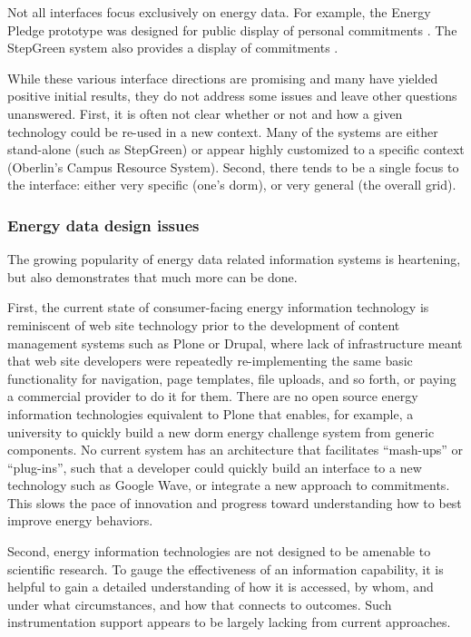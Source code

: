 Not all interfaces focus exclusively on energy data.  For example, the
Energy Pledge prototype was designed for public display of personal
commitments \cite{Pierce09}.  The StepGreen system also provides a display
of commitments \cite{StepGreen}.  

While these various interface directions are promising and many have
yielded positive initial results, they do not address some issues and leave
other questions unanswered. First, it is often not clear whether or not and
how a given technology could be re-used in a new context.  Many of the
systems are either stand-alone (such as StepGreen) or appear highly
customized to a specific context (Oberlin's Campus Resource
System). Second, there tends to be a single focus to the interface: either
very specific (one's dorm), or very general (the overall grid).  

\subsubsection{Energy data design issues}

The growing popularity of energy data related information systems is
heartening, but also demonstrates that much more can be done. 

First, the current state of consumer-facing energy information technology
is reminiscent of web site technology prior to the development of content
management systems such as Plone or Drupal, where lack of infrastructure
meant that web site developers were repeatedly re-implementing the same
basic functionality for navigation, page templates, file uploads, and so
forth, or paying a commercial provider to do it for them.  There are no
open source energy information technologies equivalent to Plone that
enables, for example, a university to quickly build a new dorm energy
challenge system from generic components.  No current system has an
architecture that facilitates ``mash-ups'' or ``plug-ins'', such that a
developer could quickly build an interface to a new technology such as
Google Wave, or integrate a new approach to commitments. This slows the
pace of innovation and progress toward understanding how to best improve
energy behaviors.

Second, energy information technologies are not designed to be amenable to
scientific research.  To gauge the effectiveness of an information
capability, it is helpful to gain a detailed understanding of how it is
accessed, by whom, and under what circumstances, and how that connects
to outcomes.  Such instrumentation support appears to be largely lacking
from current approaches.

